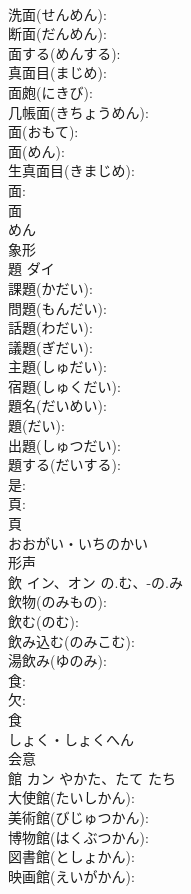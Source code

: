 \documentclass[8pt]{extreport}
\begin{document}
\begin{CJK}{UTF8}{min}
\\	洗面(せんめん): 
\\	断面(だんめん): 
\\	面する(めんする): 
\\	真面目(まじめ): 
\\	面皰(にきび): 
\\	几帳面(きちょうめん): 
\\	面(おもて): 
\\	面(めん): 
\\	生真面目(きまじめ): 
\\	面: 
\\	面	
\\	めん	
\\	象形 
\\	題	ダイ			
\\	課題(かだい): 
\\	問題(もんだい): 
\\	話題(わだい): 
\\	議題(ぎだい): 
\\	主題(しゅだい): 
\\	宿題(しゅくだい): 
\\	題名(だいめい): 
\\	題(だい): 
\\	出題(しゅつだい): 
\\	題する(だいする): 
\\	是: 
\\	頁: 
\\	頁	
\\	おおがい・いちのかい	
\\	形声 
\\	飲	イン、オン	の.む、-の.み		
\\	飲物(のみもの): 
\\	飲む(のむ): 
\\	飲み込む(のみこむ): 
\\	湯飲み(ゆのみ): 
\\	食: 
\\	欠: 
\\	食	
\\	しょく・しょくへん	
\\	会意 
\\	館	カン	やかた、たて	たち	
\\	大使館(たいしかん): 
\\	美術館(びじゅつかん): 
\\	博物館(はくぶつかん): 
\\	図書館(としょかん): 
\\	映画館(えいがかん): 

\end{CJK}
\end{document}

